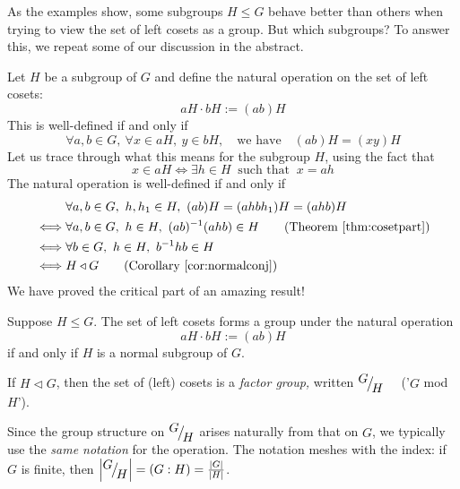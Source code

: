 
As the examples show, some subgroups $H\le G$ behave better than others when trying to view the set of left cosets as a group. But which subgroups? To answer this, we repeat some of our discussion in the abstract.\smallbreak

Let $H$ be a subgroup of $G$ and define the natural operation on the set of left cosets:
\[aH\cdot bH:=(ab)H\]
This is well-defined if and only if
\[\forall a,b\in G,\ \forall x\in aH,\ y\in bH,\quad \text{we have}\quad (ab)H=(xy)H\]
Let us trace through what this means for the subgroup $H$, using the fact that 
\[x\in aH\iff \exists h\in H\ \text{ such that }\  x=ah\]
The natural operation is well-defined if and only if
\begin{align*}
&\forall a,b\in G,\ h,h_1\in H,\ (ab)H=(ahbh_1)H=(ahb)H\\
\iff &\forall a,b\in G,\ h\in H,\ (ab)^{-1}(ahb)\in H\tag{Theorem \ref{thm:cosetpart}}\\
\iff &\forall b\in G,\ h\in H,\ b^{-1}hb\in H\\
\iff&H\triangleleft G\tag{Corollary \ref{cor:normalconj}}
\end{align*}
We have proved the critical part of an amazing result!

\begin{thm}{}{}
Suppose $H\le G$. The set of left cosets forms a group under the natural operation
\[aH\cdot bH:=(ab)H\]
if and only if $H$ is a normal subgroup of $G$.
\end{thm}

\begin{defn}{}{}
If $H\triangleleft G$, then the set of (left) cosets is a \emph{factor group,} written ${}^{\textstyle {G}}\!\big/_{\textstyle \!{H}}$ \ \ ('$G$ mod $H$').
\end{defn}

Since the group structure on $\smash[b]{{}^{\textstyle {G}}\!\big/_{\textstyle \!{H}}}$ arises naturally from that on $G$, we typically use the \emph{same notation} for the operation. The notation meshes with the index: if $G$ is finite, then $\left| {}^{\textstyle {G}}\!\big/_{\textstyle \!{H}}\right|=(G:H)=\frac{\left| G\right|}{\left| H\right|}$.


